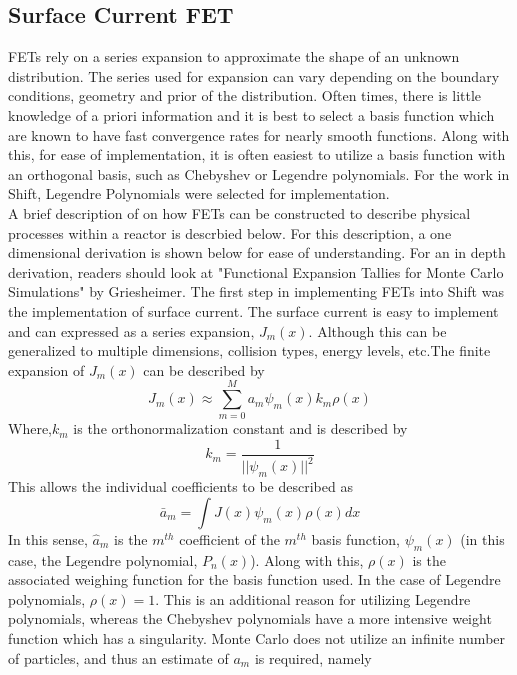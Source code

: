 \documentclass[10tma4paper]{article}
\begin{document}
\subsection{Surface Current FET}\label{Surface Current FET}

FETs rely on a series expansion to approximate the shape of an unknown distribution. The series used for expansion can vary depending on the boundary conditions, geometry and prior of the distribution. Often times, there is little knowledge of a priori information and it is best to select a basis function which are known to have fast convergence rates for nearly smooth functions. Along with this, for ease of implementation, it is often easiest to utilize a basis function with an orthogonal basis, such as Chebyshev or Legendre polynomials. For the work in Shift, Legendre Polynomials were selected for implementation.
\\
A brief description of on how FETs can be constructed to describe physical processes within a reactor is descrbied below. For this description, a one dimensional derivation is shown below for ease of understanding. For an in depth derivation, readers should look at "Functional Expansion Tallies for Monte Carlo Simulations" by Griesheimer. The first step in implementing FETs into Shift was the implementation of surface current. The surface current is easy to implement and can expressed as a series expansion, $J_{m}(x)$. Although this can be generalized to multiple dimensions, collision types, energy levels, etc.The finite expansion of $J_{m}(x)$ can be described by
	\begin{equation} \label{eq:current approx}
	J_{m}(x) \approx \sum_{m=0}^{M}a_{m}\psi_{m}(x)k_{m}\rho(x)
	\end{equation}
Where,$k_{m}$ is the orthonormalization constant and is described by
\begin{equation}\label{eq:ortho const}
k_{m} = \frac{1}{||\psi_{m}(x)||^{2}}
\end{equation} 
This allows the individual coefficients to be described as
	 \begin{equation} \label{eq:a bar m}
	\bar{a}_{m}=\int J(x)\psi_{m}(x)\rho(x)dx
	 \end{equation}
In this sense, $\hat{a}_m$ is the $m^{th}$ coefficient of the $m^{th}$ basis function, $\psi_{m}(x)$ (in this case, the Legendre polynomial, $P_{n}(x)$). Along with this, $\rho(x)$ is the associated weighing function for the basis function used. In the case of Legendre polynomials, $\rho(x)=1$. This is an additional reason for utilizing Legendre polynomials, whereas the Chebyshev polynomials have a more intensive weight function which has a singularity. Monte Carlo does not utilize an infinite number of particles, and thus an estimate of $a_{m}$ is required, namely
\end{document}
